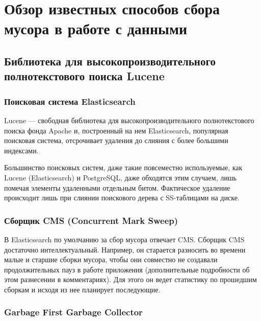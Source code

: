 \newpage
\section{Обзор известных способов сбора мусора в работе с данными}

\subsection{Библиотека для высокопроизводительного полнотекстового поиска Lucene}

\subsubsection{Поисковая система Elasticsearch}

Lucene\cite{Lucene:2008} — свободная библиотека для высокопроизводительного
полнотекстового поиска фонда Apache и, построенный на нем Elasticsearch\cite{Elasticsearch:2020},
популярная поисковая система, отсрочивает удаления до слияния с более большими индексами. 

Большинство поисковых систем, даже такие повсеместно используемые, как Lucene\cite{Lucene:2015} (Elasticsearch\cite{Elasticsearch1:2021}\cite{Elasticsearch2:2021})
и PostgreSQL, даже обходятся этим случаем, лишь помечая элементы удаленными отдельным битом.
Фактическое удаление происходит лишь при слиянии поискового дерева с SS-таблицами на диске.

\subsubsection{Сборщик CMS (Concurrent Mark Sweep)}

В Elasticsearch по умолчанию за сбор мусора отвечает CMS\cite{CMS:2015}. Сборщик CMS достаточно интеллектуальный. Например, он старается разносить во времени малые
и старшие сборки мусора, чтобы они совместно не создавали продолжительных пауз в работе приложения
(дополнительные подробности об этом разнесении в комментариях). Для этого он ведет статистику
по прошедшим сборкам и исходя из нее планирует последующие.

\subsubsection{Garbage First Garbage Collector}

